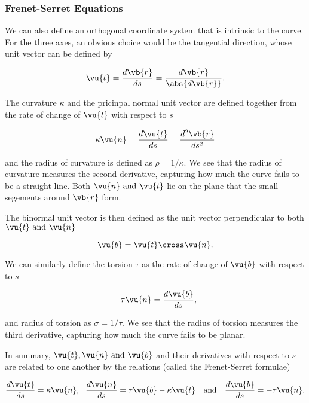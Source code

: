\documentclass[english,a4paper,12pt]{report}
\begin{document}
\subsubsection{Frenet-Serret Equations}

We can also define an orthogonal coordinate system that is intrinsic to the curve. For the three axes, an obvious choice would be the tangential direction, whose unit vector can be defined by

\begin{equation}
	\vu{t} = \frac{d\vb{r} }{ds} = \frac{d \vb{r} }{\abs{d \vb{r} } }.
\end{equation}

The curvature \(\kappa \) and the pricinpal normal unit vector are defined together from the rate of change of \(\vu{t} \) with respect to \(s\)

\begin{equation}
	\kappa \vu{n}  = \frac{d \vu{t} }{ds} = \frac{d^2\vb{r} }{ds^2}
\end{equation}

and the radius of curvature is defined as \(\rho = 1/\kappa  \). We see that the radius of curvature measures the second derivative, capturing how much the curve fails to be a straight line. Both \(\vu{n} \text { and } \vu{t} \) lie on the plane that the small segements around \(\vb{r} \) form.  

The binormal unit vector is then defined as the unit vector perpendicular to both \(\vu{t}  \text { and } \vu{n} \) 

\begin{equation}
	\vu{b} = \vu{t} \cross \vu{n} .
\end{equation}

We can similarly define the torsion \(\tau \) as the rate of change of \(\vu{b} \) with respect to \(s\)  

\begin{equation}
	-\tau \vu{n} =  \frac{d \vu{b} }{ds}, 
\end{equation}

and radius of torsion as \(\sigma  = 1/ \tau  \). We see that the radius of torsion measures the third derivative, capturing how much the curve fails to be planar.

In summary, \(\vu{t} , \vu{n} \text { and } \vu{b} \) and their derivatives with respect to \(s\) are related to one another by the relations (called the Frenet-Serret formulae) 

\begin{equation}
	\frac{d \vu{t} }{ds} = \kappa \vu{n} , ~~\frac{d \vu{n} }{ds} = \tau \vu{b} - \kappa \vu{t}~~ \text { and } ~~\frac{d \vu{b} }{ds} = -\tau \vu{n} .  
\end{equation}
\end{document}
